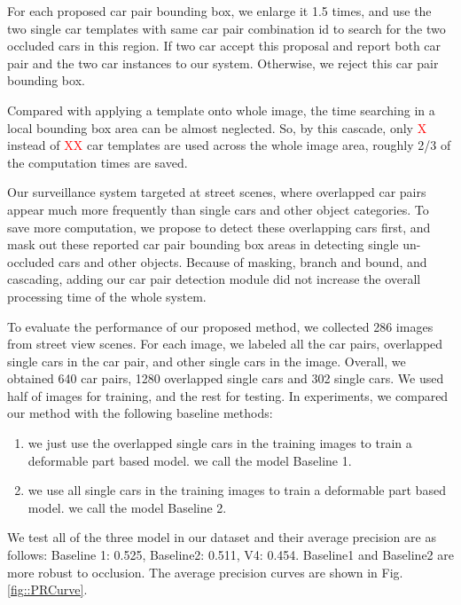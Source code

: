 \documentclass[times, 10pt,twocolumn]{article}
\begin{document}
For each proposed car pair bounding box, we enlarge it 1.5 times, and use the two single car templates with same car pair combination id to search for the two occluded cars in this region. If two car accept this proposal and report both car pair and the two car instances to our system. Otherwise, we reject this car pair bounding box. 

Compared with applying a template onto whole image, the time searching in a local bounding box area can be almost neglected. So, by this cascade, only \textcolor{red}{X}   instead of \textcolor{red}{XX}  car templates are used across the whole image area, roughly 2/3 of the computation times are saved. 

Our surveillance system targeted at street scenes, where overlapped car pairs appear much more frequently than single cars and other object categories. To save more computation, we propose to detect these overlapping cars first, and mask out these reported car pair bounding box areas in detecting single un-occluded cars and other objects.
Because of masking, branch and bound, and cascading, adding our car pair detection module did not increase the overall processing time of the whole system.



To evaluate the performance of our proposed method, we collected 286 images from street view scenes. For each image, we labeled all the car pairs, overlapped single cars in the car pair, and other single cars in the image. Overall, we obtained 640 car pairs, 1280 overlapped single cars and 302 single cars. We used half of images for training, and the rest for testing.
In experiments, we compared our method with the following baseline methods:
\begin{enumerate}
\item we just use the overlapped single cars in the training images to train a deformable part based model. we call the model Baseline 1.
\item we use all single cars in the training images to train a deformable part based model. we call the model Baseline 2.
\end{enumerate}
We test all of the three model in our dataset and their average precision are as follows: Baseline 1: 0.525, Baseline2: 0.511, V4: 0.454. Baseline1 and Baseline2 are more robust to occlusion. 
The average precision curves are shown in Fig.\ref{fig::PRCurve}.
\end{document}
